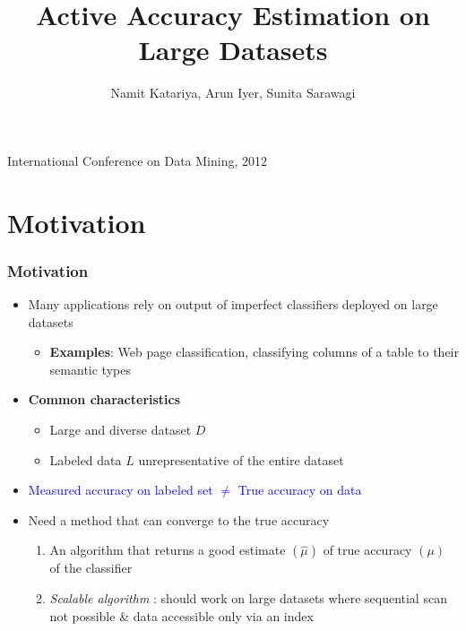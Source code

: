 \documentclass[11pt]{beamer}
\title[{\makebox[.45\paperwidth]{Active Evaluation of Classifiers\hfill%
       \insertframenumber/\inserttotalframenumber}}]{Active Accuracy Estimation on Large Datasets}
\author {Namit Katariya, Arun Iyer, Sunita Sarawagi}
\institute{IIT Bombay}
\newlength{\wideitemsep}
\let\olditem\item
\renewcommand{\item}{\setlength{\itemsep}{\wideitemsep}\olditem}
\begin{document}
\begin{frame}
\titlepage
\begin{center}
\large{International Conference on Data Mining, 2012} \\ \vspace*{10pt}
\end{center}
\end{frame}




\section{Motivation}
\begin{frame}
\frametitle{Motivation}
\pause
\begin{itemize}
\item Many applications rely on output of imperfect classifiers deployed on large datasets \\ 
\begin{itemize}
\item[] \textbf{Examples}: Web page classification, classifying columns of a table to their semantic types
\end{itemize}
\pause
\item \textbf{Common characteristics} 
\begin{itemize}
\item Large and diverse dataset $D$
\item Labeled data $L$ unrepresentative of the entire dataset
\end{itemize}
\pause
\item \textcolor{blue}{Measured accuracy on labeled set $\neq$ True accuracy on data}
\pause
\item Need a method that can converge to the true accuracy
\begin{enumerate}
\item An algorithm that returns a good estimate $(\hat{\mu})$ of true accuracy $(\mu)$ of the classifier
\item \textit{Scalable algorithm} : should work on large datasets where sequential scan not possible \& data accessible only via an index
\end{enumerate} 
\end{itemize}
\end{frame}
\end{document}
